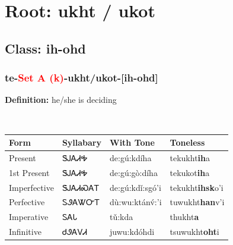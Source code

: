 \needspace{4in}
\section*{Root: ukht / ukot}
\nopagebreak
{}
\needspace{3in}
\subsection*{Class: ih-ohd}
\nopagebreak
\needspace{2in}
\subsubsection*{te{-}\textcolor{Red}{Set A (k)}{-}\textbf{ukht/ukot}{-}[ih-ohd]}
\nopagebreak
\textbf{Definition: } he/she is deciding
\\[0.5em]
\begin{tabularx}{\textwidth}{l X X X}%
\toprule%
\textbf{Form}&\textbf{Syllabary}&\textbf{With Tone}&\textbf{Toneless}\\%
\midrule%
Present&ᏕᎫᎪᏗᎭ&de:gú:kdíha&tekukht\textbf{ih}a\\%
1st Present&ᏕᎫᎪᏗᎭ&de:gú:gò:díha&tekukot\textbf{ih}a\\%
Imperfective&ᏕᎫᎪᏗᏍᎪᎢ&de:gú:kdǐ:sgó’i&tekukht\textbf{ihsk}o'i\\%
Perfective&ᏚᏭᎪᏔᏅᎢ&dù:wu:ktánv́:’i&tuwukht\textbf{han}v'i\\%
Imperative&ᏚᎪᏓ&tǔ:kda&thukht\textbf{a}\\%
Infinitive&ᏧᏭᎪᏙᏗ&juwu:kdóhdi&tsuwukht\textbf{oht}i\\%
\bottomrule%
\end{tabularx}
\\[1em]
